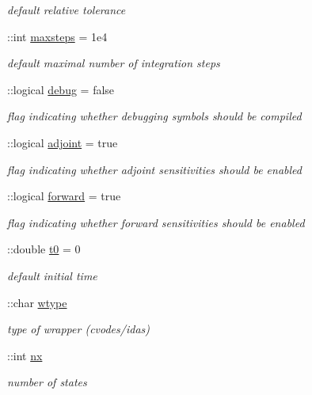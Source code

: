 \begin{DoxyCompactItemize}
\begin{DoxyCompactList}\small\item\em default relative tolerance \end{DoxyCompactList}\item 
\+::int \hyperlink{classamimodel_ac37622882dacee1f11688d4941ccb45e}{maxsteps} = 1e4
\begin{DoxyCompactList}\small\item\em default maximal number of integration steps \end{DoxyCompactList}\item 
\+::logical \hyperlink{classamimodel_a0514aabed091ee5e2f35766eb01eced6}{debug} = false
\begin{DoxyCompactList}\small\item\em flag indicating whether debugging symbols should be compiled \end{DoxyCompactList}\item 
\+::logical \hyperlink{classamimodel_ab6d500b41cf50693452415caca31d32e}{adjoint} = true
\begin{DoxyCompactList}\small\item\em flag indicating whether adjoint sensitivities should be enabled \end{DoxyCompactList}\item 
\+::logical \hyperlink{classamimodel_a81e42e48c9c72814166c8f7cd414ce24}{forward} = true
\begin{DoxyCompactList}\small\item\em flag indicating whether forward sensitivities should be enabled \end{DoxyCompactList}\item 
\+::double \hyperlink{classamimodel_abdb5a42ffee3ca622484b53a322f1004}{t0} = 0
\begin{DoxyCompactList}\small\item\em default initial time \end{DoxyCompactList}\item 
\+::char \hyperlink{classamimodel_a5376250224ce32fb558d88aa0b5a93ff}{wtype}
\begin{DoxyCompactList}\small\item\em type of wrapper (cvodes/idas) \end{DoxyCompactList}\item 
\+::int \hyperlink{classamimodel_a84e4236f07668a770c27567f1f9615ff}{nx}
\begin{DoxyCompactList}\small\item\em number of states \end{DoxyCompactList}\item 

\end{DoxyCompactItemize}
